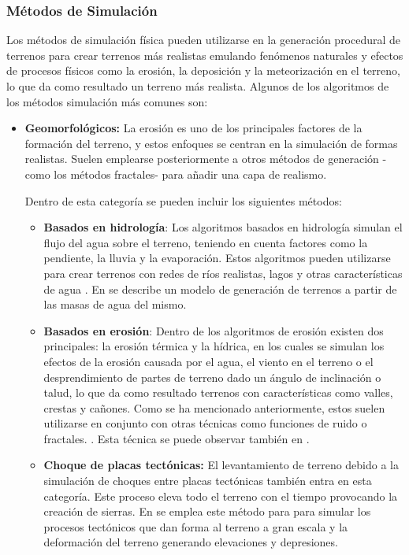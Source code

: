         \subsubsection{Métodos de Simulación}
        Los métodos de simulación física pueden utilizarse en la generación procedural de terrenos para crear terrenos más realistas emulando fenómenos naturales y efectos de procesos físicos como la erosión, la deposición y la meteorización en el terreno, lo que da como resultado un terreno más realista. Algunos de los algoritmos de los métodos simulación más comunes son:

            \begin{itemize}
                \item \textbf{Geomorfológicos:}  
                La erosión es uno de los principales factores de la formación del terreno, y estos enfoques se centran en la simulación de formas realistas. Suelen emplearse posteriormente a otros métodos de generación -como los métodos fractales- para añadir una capa de realismo. 
                
                Dentro de esta categoría se pueden incluir los siguientes métodos:
                \begin{itemize}
                    \item \textbf{Basados en hidrología}: Los algoritmos basados en hidrología simulan el flujo del agua sobre el terreno, teniendo en cuenta factores como la pendiente, la lluvia y la evaporación. Estos algoritmos pueden utilizarse para crear terrenos con redes de ríos realistas, lagos y otras características de agua \cite{AlgoritmosHidrologia} \cite{HidrologiaDocumento}. En \cite{Fischer2022} se describe un modelo de generación de terrenos a partir de las masas de agua del mismo.
                    \item \textbf{Basados en erosión}:  Dentro de los algoritmos de erosión existen dos principales: la erosión térmica y la hídrica, en los cuales se simulan los efectos de la erosión causada por el agua, el viento en el terreno o el desprendimiento de partes de terreno dado un ángulo de inclinación o talud, lo que da como resultado terrenos con características como valles, crestas y cañones. Como se ha mencionado anteriormente, estos suelen utilizarse en conjunto con otras técnicas como funciones de ruido o fractales. \cite{AlgoritmosErosion} \cite{ErosionReddit}. Esta técnica se  puede observar también en  \cite{olsen2004realtime}. 
                    \item \textbf{Choque de placas tectónicas:} El levantamiento de terreno debido a la simulación de choques entre placas tectónicas también entra en esta categoría. Este proceso eleva todo el terreno con el tiempo provocando la creación de sierras. En \cite{Cordonnier2016} se emplea este método para para simular los procesos tectónicos que dan forma al terreno a gran escala y la deformación del terreno generando elevaciones y depresiones.
                    

\end{itemize}
\end{itemize}
